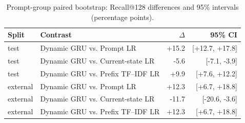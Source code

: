 \begin{table}[t]
\centering\footnotesize
\caption{Prompt-group paired bootstrap: Recall@128 differences and 95\% intervals (percentage points).}\label{tab:uncertainty}
\begin{tabular}{lp{}rr}\toprule
Split & Contrast & $\Delta$ & 95\% CI \\
\midrule
test & Dynamic GRU vs. Prompt LR & +15.2 & [+12.7, +17.8] \\
test & Dynamic GRU vs. Current-state LR & -5.6 & [-7.1, -3.9] \\
test & Dynamic GRU vs. Prefix TF--IDF LR & +9.9 & [+7.6, +12.2] \\
external & Dynamic GRU vs. Prompt LR & +12.3 & [+6.7, +18.8] \\
external & Dynamic GRU vs. Current-state LR & -11.7 & [-20.6, -3.6] \\
external & Dynamic GRU vs. Prefix TF--IDF LR & +12.3 & [+6.7, +18.8] \\
\bottomrule\end{tabular}
\end{table}
